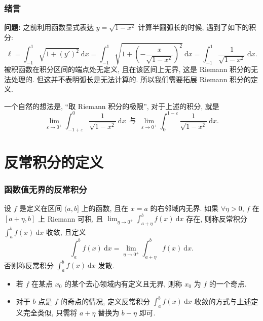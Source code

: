 \begin{frame}
\frametitle{绪言}

\textbf{问题:} 之前利用函数显式表达 $y = \sqrt{1 - x^2}$ 计算半圆弧长的时候, 遇到了如下的积分:
\[
\ell = \int_{-1}^1 \sqrt{1 + (y')^2} ~ \mathrm{d} x = \int_{-1}^1 \sqrt{1 + \left(-\frac{x}{\sqrt{1 - x^2}}\right)^2} ~ \mathrm{d} x = \int_{-1}^1 \frac{1}{\sqrt{1 - x^2}} ~ \mathrm{d} x.
\]
被积函数在积分区间的端点处无定义, 且在该区间上无界, 这是 Riemann 积分的无法处理的. 但这并不表明弧长是无法计算的. 所以我们需要拓展 Riemann 积分的定义.

\pause
\vspace{0.5em}

一个自然的想法是, \alert{``取 Riemann 积分的极限''}, 对于上述的积分, 就是
\[
\lim_{\varepsilon \to 0^+} \int_{-1 + \varepsilon}^0 \frac{1}{\sqrt{1 - x^2}} ~ \mathrm{d} x
~~ \text{与} ~~
\lim_{\varepsilon \to 0^+} \int_0^{1 - \varepsilon} \frac{1}{\sqrt{1 - x^2}} ~ \mathrm{d} x.
\]

\end{frame}


\section{反常积分的定义}


\begin{frame}
\frametitle{函数值无界的反常积分}

\begin{Def}[反常积分]
设 $f$ 是定义在区间 $(a, b]$ 上的函数, 且在 $x = a$ 的右邻域内无界. 如果 $\forall \eta > 0$, $f$ 在 $[a + \eta, b]$ 上 Riemann 可积, 且 $\lim_{\eta \to 0^+} \int_{a + \eta}^b f(x) ~ \mathrm{d} x$ 存在, 则称反常积分 $\int_a^b f(x) ~ \mathrm{d} x$ 收敛, 且定义
\[
\int_a^b f(x) ~ \mathrm{d} x = \lim_{\eta \to 0^+} \int_{a + \eta}^b f(x) ~ \mathrm{d} x.
\]
否则称反常积分 $\int_a^b f(x) ~ \mathrm{d} x$ 发散.
\end{Def}

\pause

\begin{remark}
\begin{itemize}
\item 若 $f$ 在某点 $x_0$ 的某个去心领域内有定义且无界, 则称 $x_0$ 为 $f$ 的一个奇点.
\pause
\item 对于 $b$ 点是 $f$ 的奇点的情况, 定义反常积分 $\int_a^b f(x) ~ \mathrm{d} x$ 收敛的方式与上述定义完全类似, 只需将 $a + \eta$ 替换为 $b - \eta$ 即可.
\end{itemize}
\end{remark}

\end{frame}

